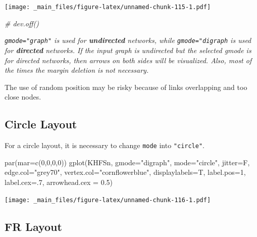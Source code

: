 \documentclass[
  notitlepage,
  onecolumn,
  openany]{book}
\newenvironment{Shaded}{\begin{snugshade}}{\end{snugshade}}
\newcommand{\AttributeTok}[1]{\textcolor[rgb]{0.77,0.63,0.00}{#1}}
\newcommand{\CommentTok}[1]{\textcolor[rgb]{0.56,0.35,0.01}{\textit{#1}}}
\newcommand{\DecValTok}[1]{\textcolor[rgb]{0.00,0.00,0.81}{#1}}
\newcommand{\FloatTok}[1]{\textcolor[rgb]{0.00,0.00,0.81}{#1}}
\newcommand{\FunctionTok}[1]{\textcolor[rgb]{0.00,0.00,0.00}{#1}}
\newcommand{\NormalTok}[1]{#1}
\newcommand{\StringTok}[1]{\textcolor[rgb]{0.31,0.60,0.02}{#1}}
\begin{document}
\texttt{[image: \_main\_files/figure-latex/unnamed-chunk-115-1.pdf]}

\begin{Shaded}
\begin{Highlighting}[]
\CommentTok{\# dev.off()}
\end{Highlighting}
\end{Shaded}

\emph{\texttt{gmode="graph"} is used for \textbf{undirected} networks, while \texttt{gmode="digraph} is used for \textbf{directed} networks. If the input graph is undirected but the selected gmode is for directed networks, then arrows on both sides will be visualized. Also, most of the times the margin deletion is not necessary.}

The use of random position may be risky because of links overlapping and too close nodes.

\hypertarget{circle-layout}{%
\subsection{Circle Layout}\label{circle-layout}}

For a circle layout, it is necessary to change \texttt{mode} into \texttt{"circle"}.

\begin{Shaded}
\begin{Highlighting}[]
\FunctionTok{par}\NormalTok{(}\AttributeTok{mar=}\FunctionTok{c}\NormalTok{(}\DecValTok{0}\NormalTok{,}\DecValTok{0}\NormalTok{,}\DecValTok{0}\NormalTok{,}\DecValTok{0}\NormalTok{))}
\FunctionTok{gplot}\NormalTok{(KHFSn, }
      \AttributeTok{gmode=}\StringTok{"digraph"}\NormalTok{,}
      \AttributeTok{mode=}\StringTok{"circle"}\NormalTok{,}
      \AttributeTok{jitter=}\NormalTok{F,}
      \AttributeTok{edge.col=}\StringTok{"grey70"}\NormalTok{,}
      \AttributeTok{vertex.col=}\StringTok{"cornflowerblue"}\NormalTok{,}
      \AttributeTok{displaylabels=}\NormalTok{T,}
      \AttributeTok{label.pos=}\DecValTok{1}\NormalTok{,}
      \AttributeTok{label.cex=}\NormalTok{.}\DecValTok{7}\NormalTok{,}
      \AttributeTok{arrowhead.cex =} \FloatTok{0.5}\NormalTok{)}
\end{Highlighting}
\end{Shaded}

\texttt{[image: \_main\_files/figure-latex/unnamed-chunk-116-1.pdf]}

\hypertarget{fr-layout}{%
\subsection{FR Layout}\label{fr-layout}}
\end{document}
